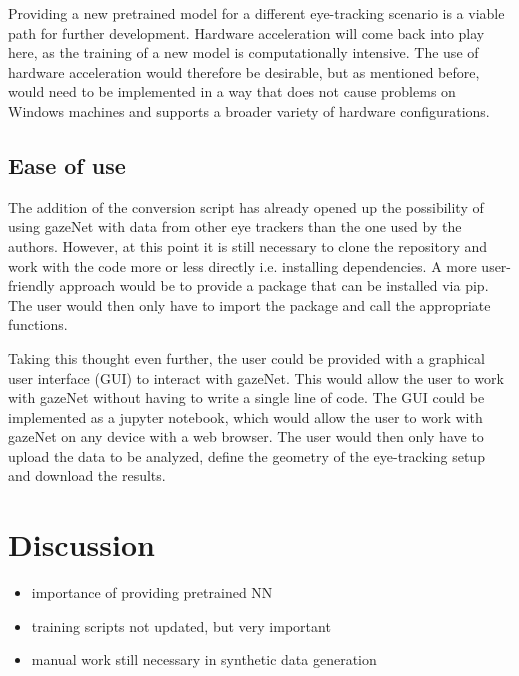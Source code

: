 \documentclass[conference]{IEEEtran}
\begin{document}
Providing a new pretrained model for a different eye-tracking scenario is a viable path for further development. Hardware acceleration will come back into play here, as the training of a new model is computationally intensive. The use of hardware acceleration would therefore be desirable, but as mentioned before, would need to be implemented in a way that does not cause problems on Windows machines and supports a broader variety of hardware configurations.

\subsection{Ease of use}
The addition of the conversion script has already opened up the possibility of using gazeNet with data from other eye trackers than the one used by the authors. However, at this point it is still necessary to clone the repository and work with the code more or less directly i.e. installing dependencies. A more user-friendly approach would be to provide a package that can be installed via pip. The user would then only have to import the package and call the appropriate functions.

Taking this thought even further, the user could be provided with a graphical user interface (GUI) to interact with gazeNet. This would allow the user to work with gazeNet without having to write a single line of code. The GUI could be implemented as a jupyter notebook, which would allow the user to work with gazeNet on any device with a web browser. The user would then only have to upload the data to be analyzed, define the geometry of the eye-tracking setup and download the results.

\section{Discussion}
\begin{itemize}
    \item importance of providing pretrained NN
    
    \item training scripts not updated, but very important

    \item manual work still necessary in synthetic data generation
\end{itemize}




\end{document}
